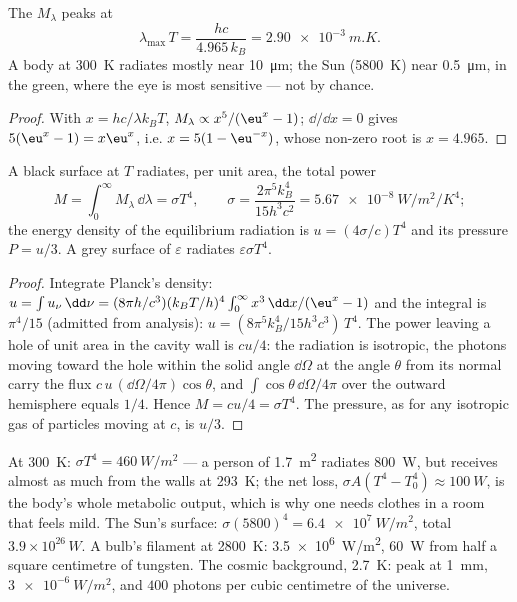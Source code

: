 \begin{proposition}\label{prop:b2:thermal-radiation:wien}
The  $M_\lambda$ peaks at
\[
\lambda_{\max}\,T = \frac{hc}{4.965\,k_B} = \qty{2.90e-3}{m.K} .
\]
A body at \qty{300}{K} radiates mostly near \qty{10}{\micro m}; the Sun
(\qty{5800}{K}) near \qty{0.5}{\micro m}, in the green, where the eye is
most sensitive --- not by chance.
\end{proposition}

\begin{proof}
With $x = hc/\lambda k_BT$, $M_\lambda \propto x^5/(\eu^x - 1)$; $\dd/\dd x = 0$
gives $5(\eu^x - 1) = x\eu^x$, i.e. $x = 5(1 - \eu^{-x})$, whose non-zero
root is $x = 4.965$.
\end{proof}

\begin{theorem}\label{thm:b2:thermal-radiation:stefan}
A black surface at $T$ radiates, per unit area, the total power
\[
M = \int_0^\infty M_\lambda\,\dd\lambda = \sigma T^4, \qquad
\sigma = \frac{2\pi^5k_B^4}{15h^3c^2} = \qty{5.67e-8}{W/m^2/K^4} ;
\]
the energy density of the equilibrium radiation is $u = (4\sigma/c)T^4$
and its pressure $P = u/3$. A grey surface of  $\varepsilon$
radiates $\varepsilon\sigma T^4$.
\end{theorem}

\begin{proof}
Integrate Planck's density: $u = \int u_\nu\,\dd\nu = (8\pi h/c^3)(k_BT/h)^4
\int_0^\infty x^3\,\dd x/(\eu^x - 1)$ and the integral is $\pi^4/15$
(admitted from analysis): $u = (8\pi^5k_B^4/15h^3c^3)\,T^4$. The power
leaving a hole of unit area in the cavity wall is $cu/4$: the
radiation is isotropic, the photons moving toward the hole within the
solid angle $\dd\Omega$ at the angle $\theta$ from its normal carry the
flux $c\,u\,(\dd\Omega/4\pi)\cos\theta$, and $\int\cos\theta\,\dd\Omega/4\pi$
over the outward hemisphere equals $1/4$. Hence $M = cu/4 = \sigma T^4$.
The pressure, as for any isotropic gas of particles moving at $c$, is
$u/3$.
\end{proof}

\begin{example}\label{ex:b2:thermal-radiation:orders}
At \qty{300}{K}: $\sigma T^4 = \qty{460}{W/m^2}$ --- a person of
\qty{1.7}{m^2} radiates \qty{800}{W}, but receives almost as much from
the walls at \qty{293}{K}; the net loss, $\sigma A(T^4 - T_0^4) \approx
\qty{100}{W}$, is the body's whole metabolic output, which is why one
needs clothes in a room that feels mild. The Sun's surface: $\sigma
(5800)^4 = \qty{6.4e7}{W/m^2}$, total $3.9 \times 10^{26}\,\unit{W}$. A
bulb's filament at \qty{2800}{K}: \qty{3.5e6}{W/m^2}, \qty{60}{W} from half
a square centimetre of tungsten. The cosmic background, \qty{2.7}{K}:
peak at \qty{1}{mm}, $\qty{3e-6}{W/m^2}$, and $400$ photons per cubic
centimetre of the universe.
\end{example}

